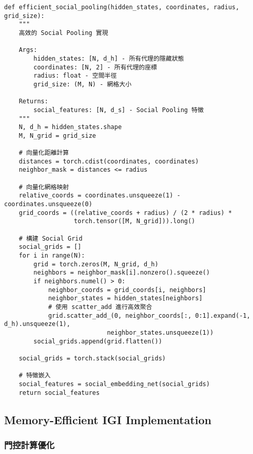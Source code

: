\documentclass[11pt,a4paper]{article}
\begin{document}
\begin{lstlisting}[style=pythonstyle, caption={高效的 Social Pooling 實現}]
def efficient_social_pooling(hidden_states, coordinates, radius, grid_size):
    """
    高效的 Social Pooling 實現
    
    Args:
        hidden_states: [N, d_h] - 所有代理的隱藏狀態
        coordinates: [N, 2] - 所有代理的座標
        radius: float - 空間半徑
        grid_size: (M, N) - 網格大小
    
    Returns:
        social_features: [N, d_s] - Social Pooling 特徵
    """
    N, d_h = hidden_states.shape
    M, N_grid = grid_size
    
    # 向量化距離計算
    distances = torch.cdist(coordinates, coordinates)
    neighbor_mask = distances <= radius
    
    # 向量化網格映射
    relative_coords = coordinates.unsqueeze(1) - coordinates.unsqueeze(0)
    grid_coords = ((relative_coords + radius) / (2 * radius) * 
                   torch.tensor([M, N_grid])).long()
    
    # 構建 Social Grid
    social_grids = []
    for i in range(N):
        grid = torch.zeros(M, N_grid, d_h)
        neighbors = neighbor_mask[i].nonzero().squeeze()
        if neighbors.numel() > 0:
            neighbor_coords = grid_coords[i, neighbors]
            neighbor_states = hidden_states[neighbors]
            # 使用 scatter_add 進行高效聚合
            grid.scatter_add_(0, neighbor_coords[:, 0:1].expand(-1, d_h).unsqueeze(1), 
                            neighbor_states.unsqueeze(1))
        social_grids.append(grid.flatten())
    
    social_grids = torch.stack(social_grids)
    
    # 特徵嵌入
    social_features = social_embedding_net(social_grids)
    return social_features
\end{lstlisting}

\subsection{Memory-Efficient IGI Implementation}

\subsubsection{門控計算優化}
\end{document}
